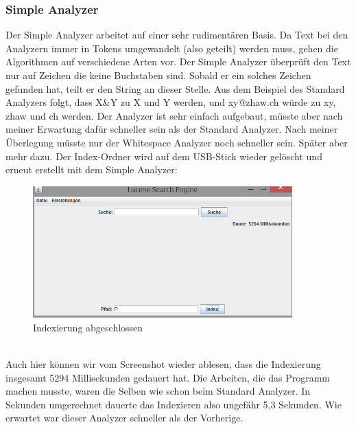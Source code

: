 \documentclass[12pt,a4paper,ngerman]{report}
\begin{document}
\subsubsection{Simple Analyzer}
Der Simple Analyzer arbeitet auf einer sehr rudimentären Basis. Da Text bei den Analyzern immer in Tokens umgewandelt (also geteilt) werden muss, gehen die Algorithmen auf verschiedene Arten vor. Der Simple Analyzer überprüft den Text nur auf Zeichen die keine Buchstaben sind. Sobald er ein solches Zeichen gefunden hat, teilt er den String an dieser Stelle. Aus dem Beispiel des Standard Analyzers folgt, dass X\&Y zu X und Y werden, und xy@zhaw.ch würde zu xy, zhaw und ch werden. Der Analyzer ist sehr einfach aufgebaut, müsste aber nach meiner Erwartung dafür schneller sein als der Standard Analyzer. Nach meiner Überlegung müsste nur der Whitespace Analyzer noch schneller sein. Später aber mehr dazu.
\newpage
Der Index-Ordner wird auf dem USB-Stick wieder gelöscht und erneut erstellt mit dem Simple Analyzer:
\begin{figure}[h!]
\centering
\includegraphics[width=10cm]{img/simple-analyzer-index.png}
\caption{Indexierung abgeschlossen\protect\footnotemark}
\end{figure}
\\
Auch hier können wir vom Screenshot wieder ablesen, dass die Indexierung insgesamt 5294 Millisekunden gedauert hat. Die Arbeiten, die das Programm machen musste, waren die Selben wie schon beim Standard Analyzer. In Sekunden umgerechnet dauerte das Indexieren also ungefähr 5,3 Sekunden. Wie erwartet war dieser Analyzer schneller als der Vorherige.
\end{document}
